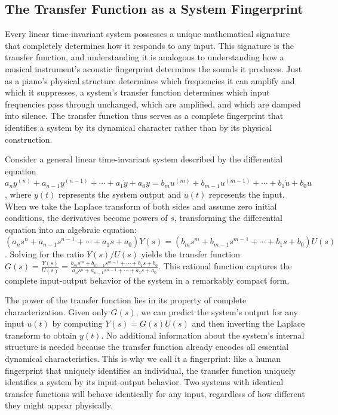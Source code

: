 \subsection{The Transfer Function as a System Fingerprint}

Every linear time-invariant system possesses a unique mathematical signature that completely determines how it responds to any input. This signature is the transfer function, and understanding it is analogous to understanding how a musical instrument's acoustic fingerprint determines the sounds it produces. Just as a piano's physical structure determines which frequencies it can amplify and which it suppresses, a system's transfer function determines which input frequencies pass through unchanged, which are amplified, and which are damped into silence. The transfer function thus serves as a complete fingerprint that identifies a system by its dynamical character rather than by its physical construction.

Consider a general linear time-invariant system described by the differential equation $a_n y^{(n)} + a_{n-1} y^{(n-1)} + \cdots + a_1 \dot{y} + a_0 y = b_m u^{(m)} + b_{m-1} u^{(m-1)} + \cdots + b_1 \dot{u} + b_0 u$, where $y(t)$ represents the system output and $u(t)$ represents the input. When we take the Laplace transform of both sides and assume zero initial conditions, the derivatives become powers of $s$, transforming the differential equation into an algebraic equation: $(a_n s^n + a_{n-1} s^{n-1} + \cdots + a_1 s + a_0) Y(s) = (b_m s^m + b_{m-1} s^{m-1} + \cdots + b_1 s + b_0) U(s)$. Solving for the ratio $Y(s)/U(s)$ yields the transfer function $G(s) = \frac{Y(s)}{U(s)} = \frac{b_m s^m + b_{m-1} s^{m-1} + \cdots + b_1 s + b_0}{a_n s^n + a_{n-1} s^{n-1} + \cdots + a_1 s + a_0}$. This rational function captures the complete input-output behavior of the system in a remarkably compact form.

The power of the transfer function lies in its property of complete characterization. Given only $G(s)$, we can predict the system's output for any input $u(t)$ by computing $Y(s) = G(s)U(s)$ and then inverting the Laplace transform to obtain $y(t)$. No additional information about the system's internal structure is needed because the transfer function already encodes all essential dynamical characteristics. This is why we call it a fingerprint: like a human fingerprint that uniquely identifies an individual, the transfer function uniquely identifies a system by its input-output behavior. Two systems with identical transfer functions will behave identically for any input, regardless of how different they might appear physically.

